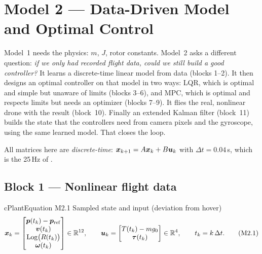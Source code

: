 \section{Model 2 --- Data-Driven Model and Optimal Control}
\label{sec:model2}

Model~1 needs the physics: $m$, $J$, rotor constants. Model~2 asks a different question: \emph{if we only had
recorded flight data, could we still build a good controller?} It learns a discrete-time linear model from
data (blocks 1--2). It then designs an optimal controller on that model in two ways: LQR, which is optimal and
simple but unaware of limits (blocks 3--6), and MPC, which is optimal and respects limits but needs an optimizer
(blocks 7--9). It flies the real, nonlinear drone with the result (block~10). Finally an extended Kalman filter
(block~11) builds the state that the controllers need from camera pixels and the gyroscope, using the same
learned model. That closes the loop.

All matrices here are \emph{discrete-time}: $\bm{x}_{k+1}=A\bm{x}_k+B\bm{u}_k$ with $\Delta t=0.04$\,s, which is the 25\,Hz
 of .

\subsection{Block 1 --- Nonlinear flight data}
\label{sec:m2b1}

\begin{eqbox}{cPlant}{Equation M2.1 \quad Sampled state and input (deviation from hover)}
\begin{equation}
  \bm{x}_k=\begin{bmatrix}\bm{p}(t_k)-\bm{p}_{\mathrm{ref}}\\ \bm{v}(t_k)\\ \mathrm{Log}\big(R(t_k)\big)\\ \bm{\omega}(t_k)\end{bmatrix}\in\mathbb{R}^{12},\qquad
  \bm{u}_k=\begin{bmatrix}T(t_k)-mg_0\\ \bm{\tau}(t_k)\end{bmatrix}\in\mathbb{R}^{4},\qquad t_k=k\,\Delta t . \tag{M2.1}\label{eq:m2.1}
\end{equation}
\end{eqbox}

